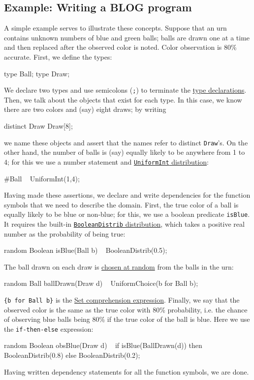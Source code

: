 \documentclass[12pt]{article}
\begin{document}
\subsection{Example: Writing a BLOG program}

A simple example serves to illustrate these concepts. Suppose that an urn contains unknown numbers of blue and green balls;
balls are drawn one at a time and then replaced after the observed color is noted. Color observation is 80\% accurate.
First, we define the types:
\begin{blogcode}
type Ball; 
type Draw; 
\end{blogcode}
We declare two types and use semicolons (\verb|;|) to terminate the \hyperref[type-declaration-section]{type declarations}. 
Then, we talk about the objects that exist for each type.
In this case, we know there are two colors and (say) eight draws; by writing
\begin{blogcode}
distinct Draw Draw[8];
\end{blogcode}
we name these objects and assert that the names refer to distinct \verb|Draw|'s.
On the other hand, the number of balls is (say) equally likely to be anywhere from 1 to 4; for this we use a number statement and \hyperref[uniformint-section]{\texttt{UniformInt} distribution}:
\begin{blogcode}
#Ball ~ UniformInt(1,4);
\end{blogcode}
Having made these assertions, we declare and write dependencies for the function symbols
that we need to describe the domain. First, the true color of a ball is 
equally likely to be blue or non-blue; for this, we use a boolean predicate 
\verb|isBlue|. It requires the built-in \hyperref[boolean-distribution-section]{\texttt{BooleanDistrib} distribution}, which takes a positive real number as the probability of being true:
\begin{blogcode}
random Boolean isBlue(Ball b) ~ BooleanDistrib(0.5);
\end{blogcode}
The ball drawn on each draw is \hyperref[uniformchoice-section]{chosen at random} from the balls in the urn:
\begin{blogcode}
random Ball ballDrawn(Draw d) ~ UniformChoice({b for Ball b});
\end{blogcode}
\verb|{b for Ball b}| is the \hyperref[set-section]{Set comprehension expression}. 
Finally, we say that the observed color is the same as the true color
with 80\% probability, i.e. the chance of observing blue balls being 
80\% if the true color of the ball is blue.
Here we use the \verb|if-then-else| expression:
\begin{blogcode}
random Boolean obsBlue(Draw d) ~
  if isBlue(BallDrawn(d)) then 
    BooleanDistrib(0.8)
  else
    BooleanDistrib(0.2);
\end{blogcode}
Having written dependency statements for all the function symbols, we are done.
\end{document}
